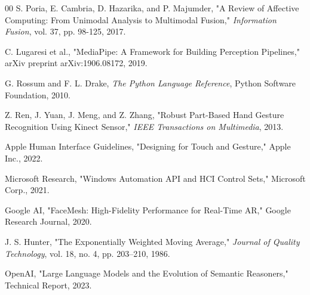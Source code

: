 \documentclass[conference]{IEEEtran}
\begin{document}
\begin{thebibliography}{00}
 S. Poria, E. Cambria, D. Hazarika, and P. Majumder, "A Review of Affective Computing: From Unimodal Analysis to Multimodal Fusion," \textit{Information Fusion}, vol. 37, pp. 98-125, 2017.

 C. Lugaresi et al., "MediaPipe: A Framework for Building Perception Pipelines," arXiv preprint arXiv:1906.08172, 2019.

 G. Rossum and F. L. Drake, \textit{The Python Language Reference}, Python Software Foundation, 2010.

 Z. Ren, J. Yuan, J. Meng, and Z. Zhang, "Robust Part-Based Hand Gesture Recognition Using Kinect Sensor," \textit{IEEE Transactions on Multimedia}, 2013.

 Apple Human Interface Guidelines, "Designing for Touch and Gesture," Apple Inc., 2022.

 Microsoft Research, "Windows Automation API and HCI Control Sets," Microsoft Corp., 2021.

 Google AI, "FaceMesh: High-Fidelity Performance for Real-Time AR," Google Research Journal, 2020.

 J. S. Hunter, "The Exponentially Weighted Moving Average," \textit{Journal of Quality Technology}, vol. 18, no. 4, pp. 203–210, 1986.

 OpenAI, "Large Language Models and the Evolution of Semantic Reasoners," Technical Report, 2023.

\end{thebibliography}
\end{document}
